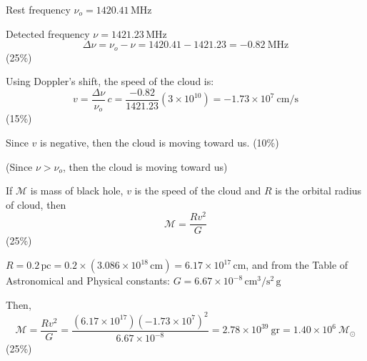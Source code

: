 Rest frequency $\nu_o = 1420.41$\,MHz

Detected frequency $\nu = 1421.23$\,MHz
\[
  \Delta\nu = \nu_o - \nu = 1420.41 - 1421.23 = -0.82\ \mathrm{MHz}
\]
\hfill(25\%)

Using Doppler's shift, the speed of the cloud is:
\[
  v = \frac{\Delta\nu}{\nu_o}\,c
    = \frac{-0.82}{1421.23}\left(3\times10^{10}\right)
    = -1.73\times10^{7}\ \mathrm{cm/s}
\]
\hfill(15\%)

Since $v$ is negative, then the cloud is moving toward us. \hfill(10\%)

(Since $\nu > \nu_o$, then the cloud is moving toward us)

If $\mathcal{M}$ is mass of black hole, $v$ is the speed of the cloud and $R$
is the orbital radius of cloud, then
\[
  \mathcal{M} = \frac{Rv^2}{G}
\]
\hfill(25\%)

$R = 0.2\,\mathrm{pc} = 0.2 \times (3.086 \times 10^{18}\,\mathrm{cm})
= 6.17 \times 10^{17}\,\mathrm{cm}$, and from the Table of Astronomical and
Physical constants: $G = 6.67 \times 10^{-8}\,\mathrm{cm}^3/\mathrm{s}^2\,\mathrm{g}$

Then,
\[
  \mathcal{M} = \frac{Rv^2}{G}
  = \frac{\left(6.17\times10^{17}\right)\left(-1.73\times10^{7}\right)^2}{6.67\times10^{-8}}
  = 2.78\times10^{39}\ \mathrm{gr} = 1.40\times10^{6}\ \mathcal{M}_\odot
\]
\hfill(25\%)
